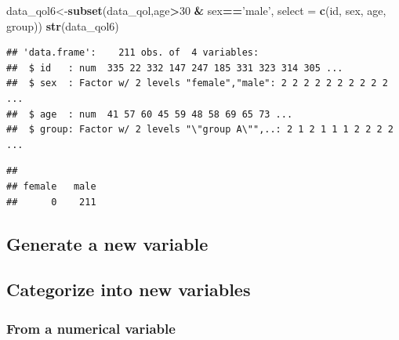 \documentclass[]{book}
\newenvironment{Shaded}{\begin{snugshade}}{\end{snugshade}}
\newcommand{\KeywordTok}[1]{\textcolor[rgb]{0.13,0.29,0.53}{\textbf{#1}}}
\newcommand{\DataTypeTok}[1]{\textcolor[rgb]{0.13,0.29,0.53}{#1}}
\newcommand{\DecValTok}[1]{\textcolor[rgb]{0.00,0.00,0.81}{#1}}
\newcommand{\StringTok}[1]{\textcolor[rgb]{0.31,0.60,0.02}{#1}}
\newcommand{\OperatorTok}[1]{\textcolor[rgb]{0.81,0.36,0.00}{\textbf{#1}}}
\newcommand{\NormalTok}[1]{#1}
\theoremstyle{definition}
\theoremstyle{definition}
\theoremstyle{remark}
\begin{document}
\begin{Shaded}
\begin{Highlighting}[]
\NormalTok{data_qol6<-}\KeywordTok{subset}\NormalTok{(data_qol,age}\OperatorTok{>}\DecValTok{30} \OperatorTok{&}\StringTok{ }\NormalTok{sex}\OperatorTok{==}\StringTok{'male'}\NormalTok{, }\DataTypeTok{select =} \KeywordTok{c}\NormalTok{(id, sex, age, group))}
\KeywordTok{str}\NormalTok{(data_qol6)}
\end{Highlighting}
\end{Shaded}

\begin{verbatim}
## 'data.frame':    211 obs. of  4 variables:
##  $ id   : num  335 22 332 147 247 185 331 323 314 305 ...
##  $ sex  : Factor w/ 2 levels "female","male": 2 2 2 2 2 2 2 2 2 2 ...
##  $ age  : num  41 57 60 45 59 48 58 69 65 73 ...
##  $ group: Factor w/ 2 levels "\"group A\"",..: 2 1 2 1 1 1 2 2 2 2 ...
\end{verbatim}

\begin{Shaded}
\end{Shaded}

\begin{verbatim}
## 
## female   male 
##      0    211
\end{verbatim}

\subsection{Generate a new variable}\label{generate-a-new-variable}

\begin{Shaded}
\end{Shaded}

\subsection{Categorize into new
variables}\label{categorize-into-new-variables}

\subsubsection{From a numerical
variable}\label{from-a-numerical-variable}
\end{document}
